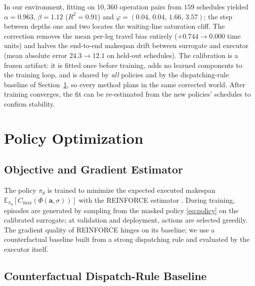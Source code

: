 In our environment, fitting on $10{,}360$ operation pairs from $159$
schedules yielded $\alpha=0.963$, $\beta=1.12$ ($R^{2}=0.91$) and
$\varphi=(0.04,\,0.04,\,1.66,\,3.57)$; the step between depths one and
two locates the waiting-line saturation cliff. The correction removes
the mean per-leg travel bias entirely ($+0.744\to0.000$ time units)
and halves the end-to-end makespan drift between surrogate and
executor (mean absolute error $24.3\to12.1$ on held-out schedules).
The calibration is a frozen artifact: it is fitted once before
training, adds no learned components to the training loop, and is
shared by \emph{all} policies and by the dispatching-rule baseline of
Section~\ref{sec:training}, so every method plans in the same
corrected world. After training converges, the fit can be re-estimated
from the new policies' schedules to confirm stability.


\section{Policy Optimization}
\label{sec:training}

\subsection{Objective and Gradient Estimator}

The policy $\pi_\theta$ is trained to minimize the expected executed
makespan $\mathbb{E}_{\pi_\theta}[C_{\max}(\Phi(\bm{a},\sigma))]$ with
the REINFORCE estimator \cite{williams1992reinforce}. During training,
episodes are generated by sampling from the masked policy
\eqref{eq:policy} on the calibrated surrogate; at validation and
deployment, actions are selected greedily. The gradient quality of
REINFORCE hinges on its baseline; we use a counterfactual baseline
built from a strong dispatching rule and evaluated by the executor
itself.

\subsection{Counterfactual Dispatch-Rule Baseline}
\label{sec:baseline}

